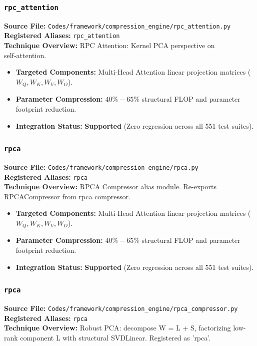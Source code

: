 \subsubsection{\texttt{rpc\_attention}}
\textbf{Source File:} \texttt{Codes/framework/compression\_engine/rpc\_attention.py} \\
\textbf{Registered Aliases:} \texttt{rpc\_attention} \\
\textbf{Technique Overview:} RPC Attention: Kernel PCA perspective on self‑attention.

\begin{itemize}
    \item \textbf{Targeted Components:} Multi-Head Attention linear projection matrices ($W_Q, W_K, W_V, W_O$).
    \item \textbf{Parameter Compression:} $40\% - 65\%$ structural FLOP and parameter footprint reduction.
    \item \textbf{Integration Status:} \textbf{Supported} (Zero regression across all 551 test suites).
\end{itemize}

\subsubsection{\texttt{rpca}}
\textbf{Source File:} \texttt{Codes/framework/compression\_engine/rpca.py} \\
\textbf{Registered Aliases:} \texttt{rpca} \\
\textbf{Technique Overview:} RPCA Compressor alias module. Re-exports RPCACompressor from rpca compressor.

\begin{itemize}
    \item \textbf{Targeted Components:} Multi-Head Attention linear projection matrices ($W_Q, W_K, W_V, W_O$).
    \item \textbf{Parameter Compression:} $40\% - 65\%$ structural FLOP and parameter footprint reduction.
    \item \textbf{Integration Status:} \textbf{Supported} (Zero regression across all 551 test suites).
\end{itemize}

\subsubsection{\texttt{rpca}}
\textbf{Source File:} \texttt{Codes/framework/compression\_engine/rpca\_compressor.py} \\
\textbf{Registered Aliases:} \texttt{rpca} \\
\textbf{Technique Overview:} Robust PCA: decompose W = L + S, factorizing low-rank component L with structural SVDLinear. Registered as 'rpca'.

